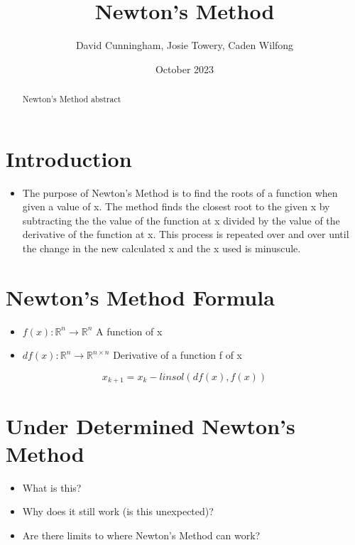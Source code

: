 \documentclass{article}
\title{Newton's Method}
\author{David Cunningham, Josie Towery, Caden Wilfong}
\date{October 2023}
\begin{document}
\begin{abstract}
   Newton's Method abstract 
\end{abstract}


\maketitle


\section{Introduction}
    \begin{itemize}
        \item \cite{encyclopedianewton} The purpose of Newton's Method is to find the roots of a function when given a value of x. The method finds the closest root to the given x by subtracting the the value of the function at x divided by the value of the derivative of the function at x. This process is repeated over and over until the change in the new calculated x and the x used is minuscule.  
    \end{itemize} 

\section{Newton's Method Formula}

\begin{itemize}
    \item $f(x): \mathbb{R}^n \rightarrow \mathbb{R}^n$ A function of x
    \item $df(x): \mathbb{R}^n \rightarrow \mathbb{R}^{n \times n}$ Derivative of a function f of x
\end{itemize}

\begin{equation}
    x_{k+1} = x_k - linsol(df(x), f(x))
\end{equation}


\section{Under Determined Newton's Method}
\begin{itemize}
    \item What is this? 
    \item Why does it still work (is this unexpected)?
    \item Are there limits to where Newton's Method can work?
\end{itemize}
\end{document}
